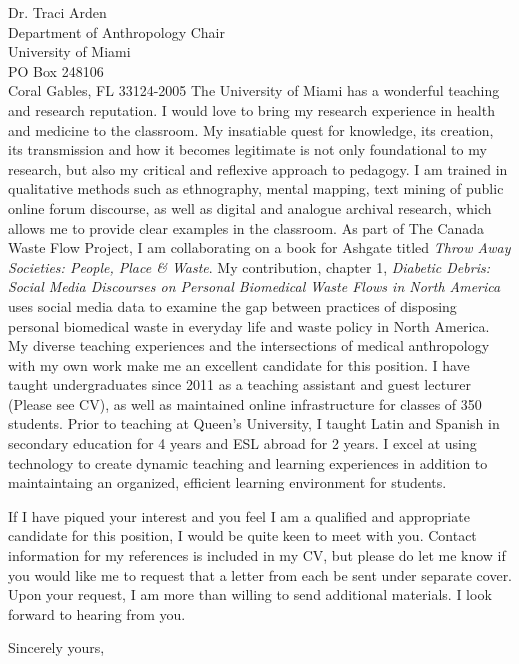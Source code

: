\documentclass[10pt]{letter} %
\begin{document}
\begin{letter}{Dr. Traci Arden \\
Department of Anthropology Chair \\
University of Miami \\
PO Box 248106 \\
Coral Gables, FL 33124-2005}
The University of Miami has a wonderful teaching and research reputation. I would love to bring my research experience in health and medicine to the classroom. My insatiable quest for knowledge, its creation, its transmission and how it becomes legitimate is not only foundational to my research, but also my critical and reflexive approach to pedagogy. I am trained in qualitative methods such as ethnography, mental mapping, text mining of public online forum discourse, as well as digital and analogue archival research, which allows me to provide clear examples in the classroom. As part of The Canada Waste Flow Project, I am collaborating on a book for Ashgate titled \textit{Throw Away Societies: People, Place \& Waste}. My contribution, chapter 1, \textit{Diabetic Debris: Social Media Discourses on Personal Biomedical Waste Flows in North America} uses social media data to examine the gap between practices of disposing personal biomedical waste in everyday life and waste policy in North America. My diverse teaching experiences and the intersections of medical anthropology with my own work make me an excellent candidate for this position. I have taught undergraduates since 2011 as a teaching assistant and guest lecturer (Please see CV), as well as maintained online infrastructure for classes of 350 students. Prior to teaching at Queen's University, I taught Latin and Spanish in secondary education for 4 years and ESL abroad for 2 years. I excel at using technology to create dynamic teaching and learning experiences in addition to maintaintaing an organized, efficient learning environment for students. 

If I have piqued your interest and you feel I am a qualified and appropriate candidate for this position, I would be quite keen to meet with you. Contact information for my references is included in my CV, but please do let me know if you would like me to request that a letter from each be sent under separate cover. Upon your request, I am more than willing to send additional materials. I look forward to hearing from you.

\closing{Sincerely yours,}




\end{letter}
\end{document}
